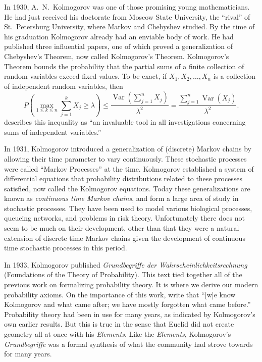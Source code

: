 \documentclass[12pt]{article}
\DeclareMathOperator{\var}{Var}
\theoremstyle{definition}
\begin{document}
In 1930, A.~N.~Kolmogorov was one of those promising young mathematicians. He
had just received his doctorate from Moscow State University, the ``rival'' of
St.~Petersburg University, where Markov and Chebyshev studied. By the time of
his graduation Kolmogorov already had an enviable body of work. He had
published three influential papers, one of which proved a generalization of
Chebyshev's Theorem, now called Kolmogorov's Theorem. Kolmogorov's Theorem
bounds the probability that the partial sums of a finite collection of random
variables exceed fixed values. To be exact, if $X_1, X_2, \dots, X_n$ is a
collection of independent random variables, then
\begin{equation*}
    P \left(\max_{1 \leq k \leq n} \sum_{j = 1}^k X_j \geq \lambda \right)
        \leq
        \frac{\var \left( \sum_{j = 1}^n X_j \right)}{\lambda^2} =
        \frac{\sum_{j = 1}^n \var(X_j)}{\lambda^2}.
\end{equation*}
\citet{cramer1976century} describes this inequality as ``an invaluable tool in
all investigations concerning sums of independent variables.''

In 1931, Kolmogorov introduced a generalization of (discrete) Markov chains by
allowing their time parameter to vary continuously. These stochastic processes
were called ``Markov Processes'' at the time. Kolmogorov established a system
of differential equations that probability distributions related to these
processes satisfied, now called the Kolmogorov equations. Today these
generalizations are known as \emph{continuous time Markov chains}, and form a
large area of study in stochastic processes. They have been used to model
various biological processes, queueing networks, and problems in risk theory.
Unfortunately there does not seem to be much on their development, other than
that they were a natural extension of discrete time Markov chains given the
development of continuous time stochastic processes in this period.

In 1933, Kolmogorov published \emph{Grundbegriffe der
Wahrscheinlichkeitsrechnung} (Foundations of the Theory of Probability). This
text tied together all of the previous work on formalizing probability theory.
It is where we derive our modern probability axioms. On the importance of this
work, \citet{shafer2006sources} write that ``[w]e know Kolmogorov and what came
after; we have mostly forgotten what came before.'' Probability theory had been
in use for many years, as indicated by Kolmogorov's own earlier results. But
this is true in the sense that Euclid did not create geometry all at once with
his \emph{Elements}. Like the \emph{Elements}, Kolmogorov's
\emph{Grundbegriffe} was a formal synthesis of what the community had strove
towards for many years. 
\end{document}
